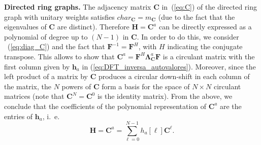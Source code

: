 \vspace{0.25cm}
\noindent\textbf{Directed ring graphs.} The adjacency matrix $ \mathbf{C} $ in~(\ref{eq:C}) of the directed ring graph with unitary weights satisfies $ char_\mathbf{C} = m_\mathbf{C} $ (due to the fact that the eigenvalues of  $\mathbf{C}$ are distinct). Therefore $ \mathbf{H} = \mathbf{C}^a $ can be directly expressed as a polynomial of degree up to  $(N-1)$ in $ \mathbf{C} $. In order to do this, we consider ~(\ref{eq:diag_C}) and the fact that $ \mathbf{F}^{-1} = \mathbf{F}^H $, with $ H $ indicating the conjugate transpose. This allows to show that  $ \mathbf{C}^a = \mathbf{F}^{H} \mathbf{\Lambda}^a_{\mathbf{C}} \mathbf{F}$ is a circulant matrix with the first column given by $ \mathbf{h}_a $ in (\ref{eq:DFT_inversa_autovalores}). Moreover, since the left product of a matrix by $\mathbf{C}$ produces a circular down-shift in each column of the matrix, the $ N $ powers of $\mathbf{C}$ form a basis for the space of $N\times N $ circulant matrices (note that $\mathbf{C}^N =  \mathbf{C}^0$ is the identity matrix). From the above, we conclude that the coefficients of the polynomial representation of $ \mathbf{C}^a $ are the entries of $ \mathbf{h}_a $, i.~e.
\begin{equation}\label{eq:poly_C}
\mathbf{H} = \mathbf{C}^a = \sum_{\ell=0}^{N-1} h_a[\ell] \mathbf{C}^\ell.
\end{equation}

